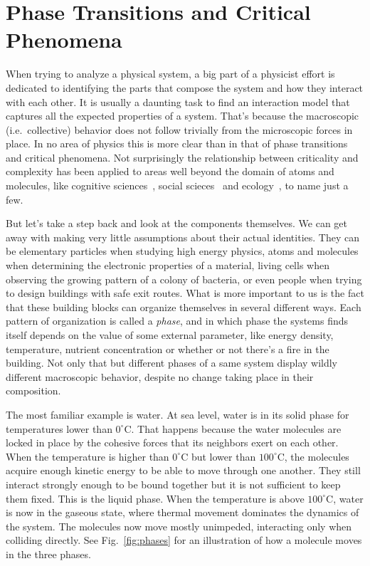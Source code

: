 \chapter{Phase Transitions and Critical Phenomena}
\label{ch:crit}

When trying to analyze a physical system, a big part of a physicist effort is
dedicated to identifying the parts that compose the system and how they
interact with each other. It is usually a daunting task to find an interaction
model that captures all the expected properties of a system. That's because the
macroscopic (i.e.\ collective) behavior does not follow trivially from the
microscopic forces in place. In no area of physics this is more clear than in
that of phase transitions and critical phenomena. Not surprisingly the
relationship between criticality and complexity has been applied to areas well
beyond the domain of atoms and molecules, like cognitive
sciences~\cite{Kello2010}, social scieces~\cite{Kron2009} and
ecology~\cite{Sole1999}, to name just a few.

But let's take a step back and look at the components themselves. We can get
away with making very little assumptions about their actual identities. They
can be elementary particles when studying high energy physics, atoms and
molecules when determining the electronic properties of a material, living
cells when observing the growing pattern of a colony of bacteria, or even
people when trying to design buildings with safe exit routes. What is more
important to us is the fact that these building blocks can organize themselves
in several different ways. Each pattern of organization is called a
\textit{phase}, and in which phase the systems finds itself depends on the
value of some external parameter, like energy density, temperature, nutrient
concentration or whether or not there's a fire in the building. Not only that
but different phases of a same system display wildly different macroscopic
behavior, despite no change taking place in their composition.

The most familiar example is water. At sea level, water is in its solid phase
for temperatures lower than $0^\circ$C. That happens because the water
molecules are locked in place by the cohesive forces that its neighbors exert
on each other. When the temperature is higher than $0^\circ$C but lower than
$100^\circ$C, the molecules acquire enough kinetic energy to be able to move
through one another. They still interact strongly enough to be bound together
but it is not sufficient to keep them fixed. This is the liquid phase. When the
temperature is above $100^\circ$C, water is now in the gaseous state, where
thermal movement dominates the dynamics of the system. The molecules
now move mostly unimpeded, interacting only when colliding directly. See
Fig.~\ref{fig:phases} for an illustration of how a molecule moves in the three
phases.


